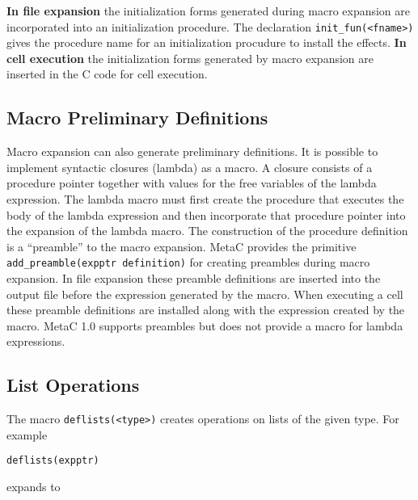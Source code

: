 \documentclass{article}
\begin{document}
{\bf In file expansion} the initialization forms generated during macro expansion are incorporated into an initialization procedure.
The declaration {\tt init\_fun(<fname>)} gives the procedure name for an initialization procudure to install the effects.
{\bf In cell execution} the initialization forms generated by macro expansion
are inserted in the C code for cell execution.

\subsection{Macro Preliminary Definitions}


Macro expansion can also generate preliminary definitions.  It is
possible to implement syntactic closures (lambda) as a macro.  A
closure consists of a procedure pointer together with values for the
free variables of the lambda expression.  The lambda macro
must first create the procedure that executes the body of the lambda
expression and then incorporate that procedure pointer into the
expansion of the lambda macro.  The construction of the procedure
definition is a ``preamble'' to the macro expansion.  MetaC provides
the primitive {\tt add\_preamble(expptr definition)} for creating
preambles during macro expansion.  In file expansion these preamble
definitions are inserted into the output file before the expression
generated by the macro.  When executing a cell these preamble
definitions are installed along with the expression created by the
macro.  MetaC 1.0 supports preambles but does not provide a macro for
lambda expressions.

\subsection{List Operations}

The macro {\tt deflists(<type>)} creates operations on lists of the given type.  For example

\medskip
\centerline{\tt deflists(expptr)}

expands to
\end{document}
